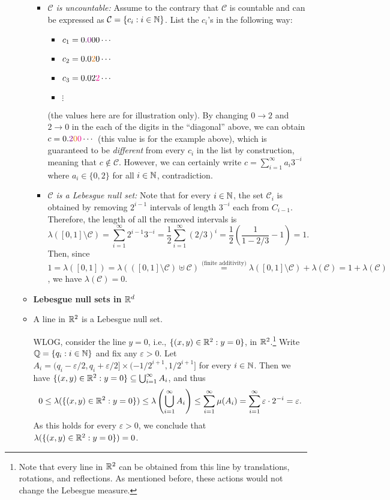 \begin{enumerate}
\begin{itemize}
\begin{pf}
\begin{itemize}
\item \emph{\(\mathcal{C}\) is uncountable:} Assume to the contrary that
\(\mathcal{C}\) is countable and can be expressed as
\(\mathcal{C}=\{c_i:i\in\mathbb{N}\}\). List the \(c_i\)'s in the following way:
\begin{itemize}
\item \(c_1=0.\vc{0}00\cdots\)
\item \(c_2=0.0\orc{2}0\cdots\)
\item \(c_3=0.02\mgc{2}\cdots\)
\item \(\vdots\)
\end{itemize}
(the values here are for illustration only). By changing \(0\to 2\) and \(2\to
0\) in the each of the digits in the ``diagonal'' above, we can obtain
\(c=0.\vc{2}\orc{0}\mgc{0}\cdots\) (this value is for the example above), which
is guaranteed to be \emph{different} from every \(c_i\) in the list by
construction, meaning that \(c\notin\mathcal{C}\). However, we can certainly
write \(c=\sum_{i=1}^{\infty}a_i3^{-i}\) where \(a_i\in\{0,2\}\) for all
\(i\in\mathbb{N}\), contradiction.
\item \emph{\(\mathcal{C}\) is a Lebesgue null set:} Note that for every
\(i\in\mathbb{N}\), the set \(\mathcal{C}_i\) is obtained by removing \(2^{i-1}\)
intervals of length \(3^{-i}\) each from \(C_{i-1}\). Therefore, the length of
all the removed intervals is
\[
\lambda([0,1]\setminus\mathcal{C})=\sum_{i=1}^{\infty}2^{i-1}3^{-i}
=\frac{1}{2}\sum_{i=1}^{\infty}(2/3)^{i}
=\frac{1}{2}\left(\frac{1}{1-2/3}-1\right)
=1.
\]
Then, since \(1=\lambda([0,1])=\lambda(([0,1]\setminus \mathcal{C})\uplus\mathcal{C})
\overset{\text{(finite additivity)}}{=}\lambda([0,1]\setminus
\mathcal{C})+\lambda(\mathcal{C})=1+\lambda(\mathcal{C})\),
we have \(\lambda(\mathcal{C})=0\).
\end{itemize}
\end{pf}
\item[] \textbf{Lebesgue null sets in \(\mathbb{R}^d\)}
\item A line in \(\mathbb{R}^2\) is a Lebesgue null set.

\begin{pf}
WLOG, consider the line \(y=0\), i.e., \(\{(x,y)\in\mathbb{R}^2:y=0\}\), in
\(\mathbb{R}^2\).\footnote{Note that every line in \(\mathbb{R}^2\) can be obtained from this
line by translations, rotations, and reflections. As mentioned before, these
actions would not change the Lebesgue measure.} Write \(\mathbb{Q}=\{q_i:i\in\mathbb{N}\}\) and
fix any \(\varepsilon>0\). Let
\(A_i=(q_i-\varepsilon/2,q_i+\varepsilon/2]\times (-1/2^{i+1},1/2^{i+1}]\) for
every \(i\in\mathbb{N}\). Then we have \(\{(x,y)\in\mathbb{R}^2:y=0\}\subseteq
\bigcup_{i=1}^{\infty}A_i\), and thus
\[
0\le\lambda(\{(x,y)\in\mathbb{R}^2:y=0\})\le\lambda\left(\bigcup_{i=1}^{\infty}A_i\right)
\le\sum_{i=1}^{\infty}\mu(A_i)
=\sum_{i=1}^{\infty}\varepsilon\cdot 2^{-i}=\varepsilon.
\]
As this holds for every \(\varepsilon>0\), we conclude that
\(\lambda(\{(x,y)\in\mathbb{R}^2:y=0\})=0\).
\end{pf}


\end{itemize}
\end{enumerate}
